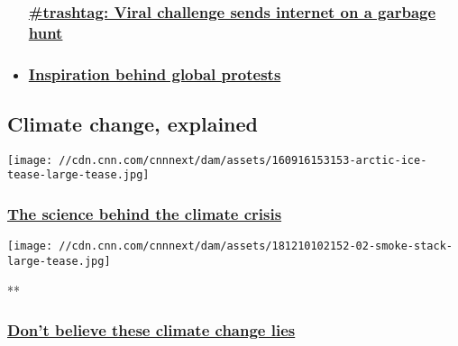 \begin{itemize}
{  \subsubsection{\texorpdfstring{\href{/2019/03/12/world/trashtag-internet-challenge-intl/index.html}{\#trashtag:
  Viral challenge sends internet on a garbage
  hunt}}{\#trashtag: Viral challenge sends internet on a garbage hunt}}\label{trashtag-viral-challenge-sends-internet-on-a-garbage-hunt}}
\item
  \hypertarget{inspiration-behind-global-protests}{%
  \subsubsection{\texorpdfstring{\href{/videos/world/2019/03/15/greta-thunberg-climate-strike.cnn}{Inspiration
  behind global
  protests}}{Inspiration behind global protests}}\label{inspiration-behind-global-protests}}
\end{itemize}

\hypertarget{climate-change-explained}{%
\subsection{Climate change, explained}\label{climate-change-explained}}

\href{/2019/09/04/us/climate-change-science-101-basics/index.html}{}

\texttt{[image: //cdn.cnn.com/cnnnext/dam/assets/160916153153-arctic-ice-tease-large-tease.jpg]}

\hypertarget{the-science-behind-the-climate-crisis-1}{%
\subsubsection{\texorpdfstring{\href{/2019/09/04/us/climate-change-science-101-basics/index.html}{The
science behind the climate
crisis}}{The science behind the climate crisis}}\label{the-science-behind-the-climate-crisis-1}}

\href{/videos/weather/2018/12/10/climate-change-myths-explainer-wx-ncc-orig-llr.cnn}{}

\texttt{[image: //cdn.cnn.com/cnnnext/dam/assets/181210102152-02-smoke-stack-large-tease.jpg]}

**

\hypertarget{dont-believe-these-climate-change-lies}{%
\subsubsection{\texorpdfstring{\href{/videos/weather/2018/12/10/climate-change-myths-explainer-wx-ncc-orig-llr.cnn}{Don't
believe these climate change
lies}}{Don't believe these climate change lies}}\label{dont-believe-these-climate-change-lies}}

